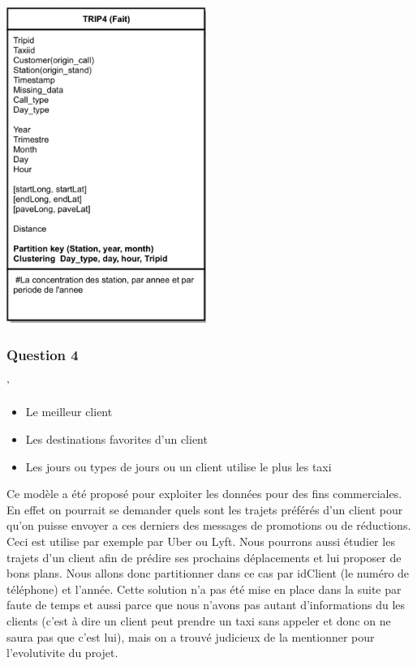 \documentclass[]{report}
\begin{document}
	\begin{center}
		\includegraphics[width=65mm]{Figures/Trip4.png}
	\end{center}
	
	\subsubsection{Question 4}'
	\begin{itemize}
		\item Le meilleur client
		\item Les destinations favorites d'un client
		\item Les jours ou types de jours ou un client utilise le plus les taxi
	\end{itemize}
	Ce modèle a été proposé pour exploiter les données pour des fins commerciales. En effet on pourrait se demander quels sont les trajets préférés d'un client pour qu'on puisse envoyer a ces derniers des messages de promotions ou de réductions. Ceci est utilise par exemple par Uber ou Lyft.  Nous pourrons aussi étudier les trajets d'un client afin de prédire ses prochains déplacements et lui proposer de bons plans. Nous allons donc partitionner dans ce cas par idClient (le numéro de téléphone) et l'année. Cette solution n'a pas été mise en place dans la suite par faute de temps et aussi parce que nous n'avons pas autant d'informations du les clients (c'est à dire un client peut prendre un taxi sans appeler et donc on ne saura pas que c'est lui), mais on a trouvé judicieux de la mentionner pour l'evolutivite du projet.
	
\end{document}
